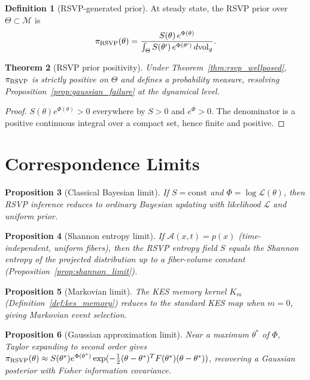 \documentclass[11pt, openright, twoside]{book}
\theoremstyle{plain}
\newtheorem{theorem}{Theorem}[chapter]
\newtheorem{proposition}[theorem]{Proposition}
\theoremstyle{definition}
\newtheorem{definition}[theorem]{Definition}
\theoremstyle{remark}
\newcommand{\Sfield}{S}
\newcommand{\Admiss}{\mathcal{A}}
\begin{document}
\begin{definition}[RSVP-generated prior]
At steady state, the RSVP prior over $\Theta\subset\mathcal{M}$ is
\begin{equation}
  \pi_{\rm RSVP}(\theta) = \frac{\Sfield(\theta)\,e^{\Phi(\theta)}}
  {\int_\Theta\Sfield(\theta')\,e^{\Phi(\theta')}\,d\mathrm{vol}_g}.
  \label{eq:rsvp_prior}
\end{equation}
\end{definition}

\begin{theorem}[RSVP prior positivity]
\label{thm:rsvp_prior_well}
Under Theorem~\ref{thm:rsvp_wellposed}, $\pi_{\rm RSVP}$ is strictly positive on $\Theta$
and defines a probability measure, resolving Proposition~\ref{prop:gaussian_failure}
at the dynamical level.
\end{theorem}

\begin{proof}
$\Sfield(\theta)e^{\Phi(\theta)}>0$ everywhere by $\Sfield>0$ and $e^\Phi>0$.
The denominator is a positive continuous integral over a compact set, hence finite and positive.
\end{proof}

\section{Correspondence Limits}

\begin{proposition}[Classical Bayesian limit]
If $\Sfield=\mathrm{const}$ and $\Phi=\log\mathcal{L}(\theta)$, then RSVP inference
reduces to ordinary Bayesian updating with likelihood $\mathcal{L}$ and uniform prior.
\end{proposition}

\begin{proposition}[Shannon entropy limit]
If $\Admiss(x,t)=p(x)$ (time-independent, uniform fibers), then the RSVP entropy field
$\Sfield$ equals the Shannon entropy of the projected distribution up to a fiber-volume constant
(Proposition~\ref{prop:shannon_limit}).
\end{proposition}

\begin{proposition}[Markovian limit]
The KES memory kernel $K_m$ (Definition~\ref{def:kes_memory}) reduces to the standard KES
map when $m=0$, giving Markovian event selection.
\end{proposition}

\begin{proposition}[Gaussian approximation limit]
Near a maximum $\theta^*$ of $\Phi$, Taylor expanding to second order gives
$\pi_{\rm RSVP}(\theta)\approx\Sfield(\theta^*)e^{\Phi(\theta^*)}\exp(-\frac{1}{2}(\theta-\theta^*)^T F(\theta^*)(\theta-\theta^*))$,
recovering a Gaussian posterior with Fisher information covariance.
\end{proposition}
\end{document}
